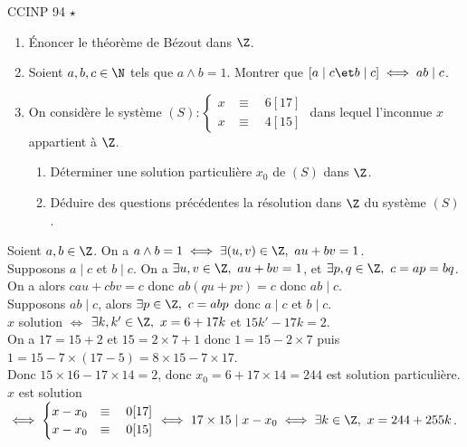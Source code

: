 \documentclass[11pt]{article}
\begin{document}
\begin{exercice}{CCINP 94 $\star$}{}
    \begin{enumerate}
        \item Énoncer le théorème de Bézout dans $\Z$.
        \item Soient $a,b,c\in \N$ tels que $a\land b = 1$. Montrer que $[a \mid c \et b \mid c] \iff ab \mid c$.
        \item On considère le système $(S):\begin{cases} x &\equiv \quad 6[17] \\ x &\equiv \quad 4[15]\end{cases}$ dans lequel l'inconnue $x$ appartient à $\Z$.
        \begin{enumerate}
            \item Déterminer une solution particulière $x_0$ de $(S)$ dans $\Z$.
            \item Déduire des questions précédentes la résolution dans $\Z$ du système $(S)$.
        \end{enumerate}
    \end{enumerate}
    \tcblower
     Soient $a,b\in \Z$. On a $a\land b = 1 \iff \exists (u,v)\in\Z, ~ au+bv=1$.\\
     Supposons $a\mid c$ et $b\mid c$. On a $\exists u,v \in \Z, ~ au+bv=1$, et $\exists p,q \in \Z, ~ c=ap=bq$.\\
    On a alors $cau+cbv=c$ donc $ab(qu+pv)=c$ donc $ab\mid c$.\\
     Supposons $ab\mid c$, alors $\exists p \in \Z, ~ c = abp$ donc $a\mid c$ et $b\mid c$.\\
     $x$ solution $\iff$ $\exists k,k' \in \Z, ~ x = 6 + 17k$ et $15k'-17k=2$.\\
    On a $17=15+2$ et $15=2\times7+1$ donc $1=15-2\times7$ puis $1=15-7\times (17 - 5)=8\times15-7\times17$.\\
    Donc $15\times16 - 17\times 14 = 2$, donc $x_0=6+17\times14=244$ est solution particulière.\\
     $x$ est solution $\iff \begin{cases}x-x_0 &\equiv \quad 0[17]\\ x-x_0 &\equiv \quad 0[15]\end{cases} \iff 17\times15 \mid x-x_0\iff \exists k \in \Z, ~ x = 244 + 255k$.
\end{exercice}
\end{document}
